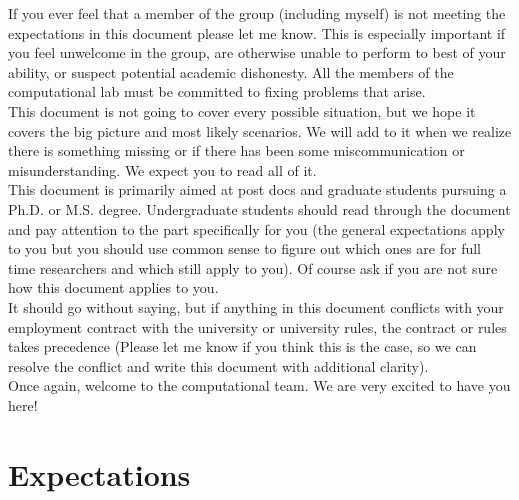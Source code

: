 \documentclass[letterpaper]{article}
\begin{document}
If you ever feel that a member of the group (including myself) is not meeting the expectations in this document please let me know. This is especially important if you feel unwelcome in the group, are otherwise unable to perform to best of your ability, or suspect potential academic dishonesty. All the members of the computational lab must be committed to fixing problems that arise.\\

This document is not going to cover every possible situation, but we hope it covers the big picture and most likely scenarios. We will add to it when we realize there is something missing or if there has been some miscommunication or misunderstanding. We expect you to read all of it.\\

This document is primarily aimed at post docs and graduate students pursuing a Ph.D. or M.S. degree. Undergraduate students should read through the document and pay attention to the part specifically for you (the general expectations apply to you but you should use common sense to figure out which ones are for full time researchers and which still apply to you). Of course ask if you are not sure how this document applies to you.\\

It should go without saying, but if anything in this document conflicts with your employment contract with the university or university rules, the contract or rules takes precedence (Please let me know if you think this is the case, so we can resolve the conflict and write this document with additional clarity).\\

Once again, welcome to the computational team. We are very excited to have you here!

\section{Expectations}
\end{document}
